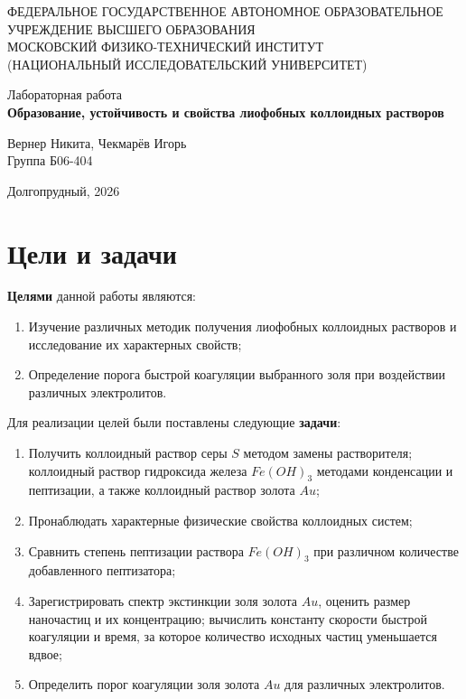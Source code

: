 \documentclass[a4paper,12pt]{article}
\author{Егор Баранов, Шорина Анна}
\date{\today}
\begin{document}
\begin{center}
	\footnotesize{ФЕДЕРАЛЬНОЕ ГОСУДАРСТВЕННОЕ АВТОНОМНОЕ ОБРАЗОВАТЕЛЬНОЕ 	
    \\УЧРЕЖДЕНИЕ ВЫСШЕГО ОБРАЗОВАНИЯ}\\
	\footnotesize{МОСКОВСКИЙ ФИЗИКО-ТЕХНИЧЕСКИЙ ИНСТИТУТ\\(НАЦИОНАЛЬНЫЙ 			ИССЛЕДОВАТЕЛЬСКИЙ УНИВЕРСИТЕТ)}\\
	\hfill \break

	\hfill \break
	\hfill \break
	\hfill \break
	\hfill \break
	\hfill \break
	\hfill \break
	\hfill \break
	\hfill \break
	\Large{Лабораторная работа \\\textbf{Образование, устойчивость и свойства лиофобных коллоидных растворов}}\\
	\hfill \break
	\hfill \break
	\hfill \break
	\begin{flushright}
		Вернер Никита, Чекмарёв Игорь\\
		Группа Б06-404
	\end{flushright}
	\hfill \break
	\hfill \break
	\hfill \break
	\hfill \break
	\hfill \break
	\hfill \break
	\hfill \break
	\hfill \break
	\hfill \break
	\hfill \break
\end{center}
\begin{center}
	Долгопрудный, 2026
\end{center}
\thispagestyle{empty}
\newpage

\section{Цели и задачи}
\noindent \textbf{Целями} данной работы являются:
\begin{enumerate}
    \item Изучение различных методик получения лиофобных коллоидных растворов и исследование их характерных свойств;
    \item Определение порога быстрой коагуляции выбранного золя при воздействии различных электролитов.
\end{enumerate}
Для реализации целей были поставлены следующие \textbf{задачи}:
\begin{enumerate}
      \item Получить коллоидный раствор серы $S$ методом замены растворителя; коллоидный раствор гидроксида железа $Fe(OH)_3$ методами конденсации и пептизации, а также коллоидный раствор золота $Au$;
    \item Пронаблюдать характерные физические свойства коллоидных систем;
    \item Сравнить степень пептизации раствора $Fe(OH)_3$ при различном количестве добавленного пептизатора;
    \item Зарегистрировать спектр экстинкции золя золота $Au$, оценить размер наночастиц и их концентрацию; вычислить константу скорости быстрой коагуляции  и время, за которое количество исходных частиц уменьшается вдвое;
    \item Определить порог коагуляции золя золота $Au$ для различных электролитов.
\end{enumerate}
\end{document}
